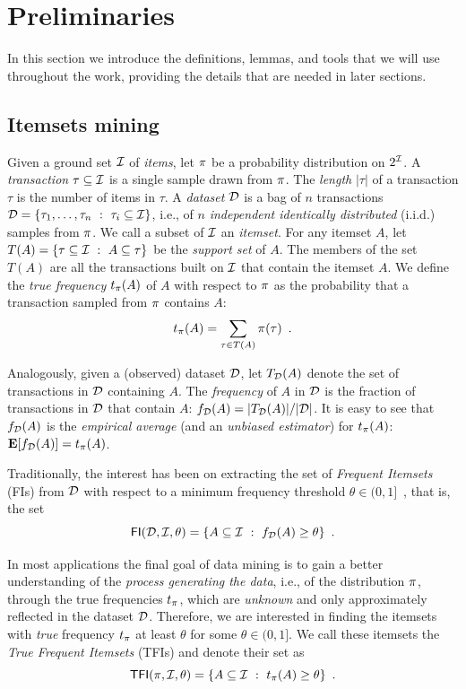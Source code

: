 \section{Preliminaries}\label{sec:prelims}
In this section we introduce the definitions, lemmas, and tools that we will use
throughout the work, providing the details that are needed in later sections.

\subsection{Itemsets mining}\label{sec:itemdef}
Given a ground set ${\cal I}$ of \emph{items}, let $\pi$ be a
probability distribution on $2^{{\cal I}}$. A \emph{transaction} $\tau\subseteq{\cal I}$
is a single sample drawn from $\pi$. The \emph{length} $|\tau|$ of
a transaction $\tau$ is the number of items in $\tau$.
A \emph{dataset}
${\cal D}$ is a bag of $n$ transactions ${\cal D}=\{\tau_1,\dots,\tau_n ~:~
\tau_i\subseteq{\cal I}\}$, i.e., of $n$
\emph{independent identically distributed} (i.i.d.) samples from $\pi$. We
call a subset of ${\cal I}$ an \emph{itemset}. For any itemset $A$, let
$T(A)=\{\tau\subseteq{\cal I} ~:~ A\subseteq \tau\}$ be the \emph{support set}
of $A$. The members of the set $T(A)$ are all the transactions built on ${\cal I}$
that contain the itemset $A$. %
We define the
\emph{true frequency} $t_\pi(A)$ of $A$ with respect to $\pi$ as the
probability that a transaction sampled from $\pi$ contains $A$:
\[
t_\pi(A) = \sum_{\tau\in T(A)}\pi(\tau)\enspace.
\]

Analogously, given a (observed) dataset ${\cal D}$, let $T_{\cal D}(A)$ denote
the set of transactions in ${\cal D}$ containing $A$. The \emph{frequency} of $A$
in ${\cal D}$ is the fraction of transactions in ${\cal D}$ that contain $A$: $f_{\cal D}(A)=
|T_{\cal D}(A)|/|{\cal D}|$. It is easy to see that $f_{\cal D}(A)$ is the
\emph{empirical average} (and an \emph{unbiased estimator}) for $t_\pi(A)$:
${\mathbf E}[f_{\cal D}(A)]=t_\pi(A)$.

Traditionally, the interest has been on extracting the set
of \emph{Frequent Itemsets} (FIs) from ${\cal D}$ with respect to a minimum frequency
threshold $\theta\in(0,1]$~\citep{AgrawalIS93}, that is, the set
\[
\mathsf{FI}({\cal D},{\cal I},\theta)=\{A\subseteq{\cal I} ~:~ f_{\cal D}(A)\ge\theta\}\enspace.\]

In most applications the final goal of data mining is to gain a better
understanding of the \emph{process generating the data}, i.e., of the
distribution $\pi$, through the true frequencies $t_\pi$, which are
\emph{unknown} and only approximately reflected in the dataset ${\cal D}$. Therefore, %
we are interested in finding the itemsets with \emph{true} frequency
$t_\pi$ at least $\theta$ for some $\theta\in(0,1]$. We call these itemsets the
\emph{True Frequent Itemsets} (TFIs) and denote their set as %
\[
\mathsf{TFI}(\pi,{\cal I},\theta)=\{A\subseteq{\cal I} ~:~ t_\pi(A)\ge\theta\}\enspace.\]

